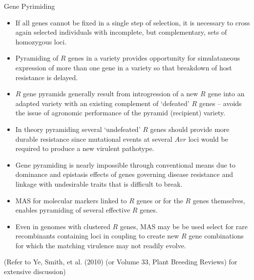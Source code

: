 \documentclass[11pt,dvipsnames,ignorenonframetext,aspectratio=169]{beamer}
\providecommand{\tightlist}{%
  \setlength{\itemsep}{0pt}\setlength{\parskip}{0pt}}
\begin{document}
\begin{frame}{Gene Pyrimiding}
\small

\begin{itemize}
\tightlist
\item
  If all genes cannot be fixed in a single step of selection, it is
  necessary to cross again selected individuals with incomplete, but
  complementary, sets of homozygous loci.
\item
  Pyramiding of \(R\) genes in a variety provides opportunity for
  simulataneous expression of more than one gene in a variety so that
  breakdown of host resistance is delayed.
\item
  \(R\) gene pyramids generally result from introgression of a new \(R\)
  gene into an adapted variety with an existing complement of `defeated'
  \(R\) genes -- avoids the issue of agronomic performance of the
  pyramid (recipient) variety.
\item
  In theory pyramiding several `undefeated' \(R\) genes should provide
  more durable resistance since mutational events at several \(Avr\)
  loci would be required to produce a new virulent pathotype.
\end{itemize}
\end{frame}

\begin{frame}{}
\protect\hypertarget{section-6}{}
\small

\begin{itemize}
\tightlist
\item
  Gene pyramiding is nearly impossible through conventional means due to
  dominance and epistasis effects of genes governing disease resistance
  and linkage with undesirable traits that is difficult to break.
\item
  MAS for molecular markers linked to \(R\) genes or for the \(R\) genes
  themselves, enables pyramiding of several effective \(R\) genes.
\item
  Even in genomes with clustered \(R\) genes, MAS may be be used select
  for rare recombinants containing loci in coupling to create new \(R\)
  gene combinations for which the matching virulence may not readily
  evolve.
\end{itemize}

(\footnotesize Refer to Ye, Smith, et al. (2010) (or Volume 33, Plant
Breeding Reviews) for extensive discussion)
\end{frame}
\end{document}
